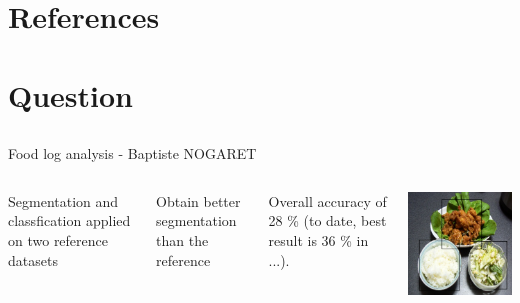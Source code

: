 \documentclass[aspectratio=169]{beamer}
\let\oldsection\section
\renewcommand{\section}[1]{
    \oldsection{#1}	
    \subsection{}
}
\newenvironment{myframe}[1][t]{\begin{frame}[#1]{\secname}{\subsecname}}{\end{frame}}
\begin{document}
    \section{References}
    
    \begin{myframe}[t, allowframebreaks]
        \printbibliography[heading=none]
    \end{myframe}
    
    \section{Question}
    
    {
        \begin{frame}{Food log analysis - Baptiste NOGARET}{}
            \begin{columns}
                Segmentation and classfication applied on two reference datasets
                
                Obtain better segmentation than the reference
                
                Overall accuracy of 28 \% (to date, best result is 36 \% in ...).
                
                \includegraphics[width=\textwidth]{../img/seg_97_gt}
            \end{columns}
        \end{frame}
    }
   
\end{document}
